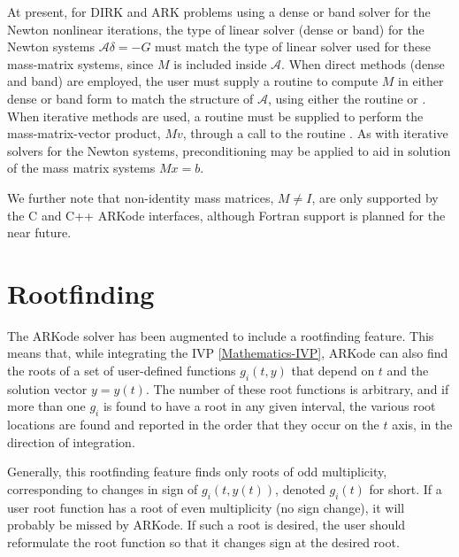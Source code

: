 \documentclass[letterpaper,10pt,english]{sphinxmanual}
\begin{document}
At present, for DIRK and ARK problems using a dense or band solver for
the Newton nonlinear iterations, the type of linear solver (dense or
band) for the Newton systems \({\mathcal A}\delta = -G\) must
match the type of linear solver used for these mass-matrix systems,
since \(M\) is included inside \({\mathcal A}\).  When direct
methods (dense and band) are employed, the user must supply a routine
to compute \(M\) in either dense or band form to match the
structure of \({\mathcal A}\), using either the routine
{\hyperref[c_interface/User_supplied:c.ARKDlsDenseMassFn]{\emph{}}} or {\hyperref[c_interface/User_supplied:c.ARKDlsBandMassFn]{\emph{}}}.  When
iterative methods are used, a routine must be supplied to perform the
mass-matrix-vector product, \(Mv\), through a call to the routine
{\hyperref[c_interface/User_supplied:c.ARKSpilsMassTimesVecFn]{\emph{}}}.  As with iterative solvers for the
Newton systems, preconditioning may be applied to aid in solution of
the mass matrix systems \(Mx=b\).

We further note that non-identity mass matrices, \(M\ne I\), are
only supported by the C and C++ ARKode interfaces, although Fortran
support is planned for the near future.


\section{Rootfinding}
\label{Mathematics:mathematics-rootfinding}\label{Mathematics:rootfinding}
The ARKode solver has been augmented to include a rootfinding
feature. This means that, while integrating the IVP \eqref{Mathematics-IVP}, ARKode
can also find the roots of a set of user-defined functions
\(g_i(t,y)\) that depend on \(t\) and the solution vector
\(y = y(t)\). The number of these root functions is arbitrary, and
if more than one \(g_i\) is found to have a root in any given
interval, the various root locations are found and reported in the
order that they occur on the \(t\) axis, in the direction of
integration.

Generally, this rootfinding feature finds only roots of odd
multiplicity, corresponding to changes in sign of \(g_i(t,
y(t))\), denoted \(g_i(t)\) for short. If a user root function has
a root of even multiplicity (no sign change), it will probably be
missed by ARKode. If such a root is desired, the user should
reformulate the root function so that it changes sign at the desired
root.
\end{document}

